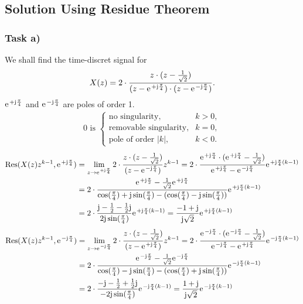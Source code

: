 \subsection{Solution Using Residue Theorem}
\subsubsection{Task a)}
We shall find the time-discret signal for
\begin{align}
	X(z)=2\cdot\frac{z\cdot(z-\frac{1}{\sqrt{2}})}{(z-\e^{+\im\frac{\pi}{4}})\cdot(z-\e^{-\im\frac{\pi}{4}})}.
\end{align}
$\e^{+\im\frac{\pi}{4}}$ and $\e^{-\im\frac{\pi}{4}}$ are poles of order 1.\\
\begin{align}
	0\text{ is }
	\begin{cases}
	\text{no singularity}, &k > 0, \\
	\text{removable singularity}, &k = 0, \\
	\text{pole of order }|k|, &k <0. 
\end{cases}
\end{align}
\begin{align}
	\mathrm{Res}(X(z)z^{k-1},\e^{+\im\frac{\pi}{4}})&=\lim\limits_{z\rightarrow\e^{+\im\frac{\pi}{4}}}2\cdot\frac{z\cdot(z-\frac{1}{\sqrt{2}})}{(z-\e^{-\im\frac{\pi}{4}})}z^{k-1}=2\cdot\frac{\e^{+\im\frac{\pi}{4}}\cdot(\e^{+\im\frac{\pi}{4}}-\frac{1}{\sqrt{2}})}{\e^{+\im\frac{\pi}{4}}-\e^{-\im\frac{\pi}{4}}}\e^{+\im\frac{\pi}{4}(k-1)} \nonumber \\
	&=2\cdot\frac{\e^{+\im\frac{\pi}{2}}-\frac{1}{\sqrt{2}}\e^{+\im\frac{\pi}{4}}}{\cos(\frac{\pi}{4})+\im\sin(\frac{\pi}{4})-(\cos(\frac{\pi}{4})-\im\sin(\frac{\pi}{4}))}\e^{+\im\frac{\pi}{4}(k-1)}\nonumber\\
	&=2\cdot\frac{\im-\frac{1}{2}-\frac{1}{2}\im}{2\im\sin(\frac{\pi}{4})}\e^{+\im\frac{\pi}{4}(k-1)}=\frac{-1+\im}{\im\sqrt{2}}\e^{+\im\frac{\pi}{4}(k-1)}
\end{align}
\begin{align}
	\mathrm{Res}(X(z)z^{k-1},\e^{-\im\frac{\pi}{4}})&=\lim\limits_{z\rightarrow\e^{-\im\frac{\pi}{4}}}2\cdot\frac{z\cdot(z-\frac{1}{\sqrt{2}})}{(z-\e^{+\im\frac{\pi}{4}})}z^{k-1}=2\cdot\frac{\e^{-\im\frac{\pi}{4}}\cdot(\e^{-\im\frac{\pi}{4}}-\frac{1}{\sqrt{2}})}{\e^{-\im\frac{\pi}{4}}-\e^{+\im\frac{\pi}{4}}}\e^{-\im\frac{\pi}{4}(k-1)} \nonumber \\
	&=2\cdot\frac{\e^{-\im\frac{\pi}{2}}-\frac{1}{\sqrt{2}}\e^{-\im\frac{\pi}{4}}}{\cos(\frac{\pi}{4})-\im\sin(\frac{\pi}{4})-(\cos(\frac{\pi}{4})+\im\sin(\frac{\pi}{4}))}\e^{-\im\frac{\pi}{4}(k-1)}\nonumber\\
	&=2\cdot\frac{-\im-\frac{1}{2}+\frac{1}{2}\im}{-2\im\sin(\frac{\pi}{4})}\e^{-\im\frac{\pi}{4}(k-1)}=\frac{1+\im}{\im\sqrt{2}}\e^{-\im\frac{\pi}{4}(k-1)}
\end{align}
